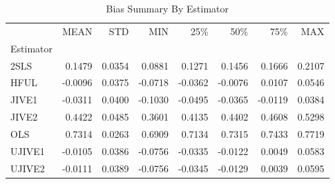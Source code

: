 \begin{table}[ht]
\centering
\caption{Bias Summary By Estimator}
\begin{tabular}{lrrrrrrr}
\toprule
 & MEAN & STD & MIN & 25\% & 50\% & 75\% & MAX \\
Estimator &  &  &  &  &  &  &  \\
\midrule
2SLS & 0.1479 & 0.0354 & 0.0881 & 0.1271 & 0.1456 & 0.1666 & 0.2107 \\
HFUL & -0.0096 & 0.0375 & -0.0718 & -0.0362 & -0.0076 & 0.0107 & 0.0546 \\
JIVE1 & -0.0311 & 0.0400 & -0.1030 & -0.0495 & -0.0365 & -0.0119 & 0.0384 \\
JIVE2 & 0.4422 & 0.0485 & 0.3601 & 0.4135 & 0.4402 & 0.4608 & 0.5298 \\
OLS & 0.7314 & 0.0263 & 0.6909 & 0.7134 & 0.7315 & 0.7433 & 0.7719 \\
UJIVE1 & -0.0105 & 0.0386 & -0.0756 & -0.0335 & -0.0122 & 0.0049 & 0.0583 \\
UJIVE2 & -0.0111 & 0.0389 & -0.0756 & -0.0345 & -0.0129 & 0.0039 & 0.0595 \\
\bottomrule
\end{tabular}
\end{table}

